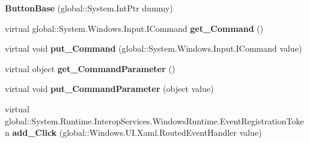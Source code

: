 \begin{DoxyCompactItemize}
\item 
\mbox{\label{class_windows_1_1_u_i_1_1_xaml_1_1_controls_1_1_primitives_1_1_button_base_a851f5f68708d5a8ca328fd2bb6c9e52f}} 
{\bfseries Button\+Base} (global\+::\+System.\+Int\+Ptr dummy)
\item 
\mbox{\label{class_windows_1_1_u_i_1_1_xaml_1_1_controls_1_1_primitives_1_1_button_base_a828bb580c4aeeb639426f27ce0b6c586}} 
virtual global\+::\+System.\+Windows.\+Input.\+I\+Command {\bfseries get\+\_\+\+Command} ()
\item 
\mbox{\label{class_windows_1_1_u_i_1_1_xaml_1_1_controls_1_1_primitives_1_1_button_base_a27ec61fd5abbda5b2d691374503645fc}} 
virtual void {\bfseries put\+\_\+\+Command} (global\+::\+System.\+Windows.\+Input.\+I\+Command value)
\item 
\mbox{\label{class_windows_1_1_u_i_1_1_xaml_1_1_controls_1_1_primitives_1_1_button_base_a71053af3b8056232052cbff4a66ff6f1}} 
virtual object {\bfseries get\+\_\+\+Command\+Parameter} ()
\item 
\mbox{\label{class_windows_1_1_u_i_1_1_xaml_1_1_controls_1_1_primitives_1_1_button_base_a86576fdbbfa333daaeb36e8f5a364daa}} 
virtual void {\bfseries put\+\_\+\+Command\+Parameter} (object value)
\item 
\mbox{\label{class_windows_1_1_u_i_1_1_xaml_1_1_controls_1_1_primitives_1_1_button_base_a31798116cfe3b23bc8cca409f8286eb8}} 
virtual global\+::\+System.\+Runtime.\+Interop\+Services.\+Windows\+Runtime.\+Event\+Registration\+Token {\bfseries add\+\_\+\+Click} (global\+::\+Windows.\+U\+I.\+Xaml.\+Routed\+Event\+Handler value)
\item 
\mbox{\label{class_windows_1_1_u_i_1_1_xaml_1_1_controls_1_1_primitives_1_1_button_base_ab98c10641e50dd837e7182b45444a6cb}} 

\end{DoxyCompactItemize}
